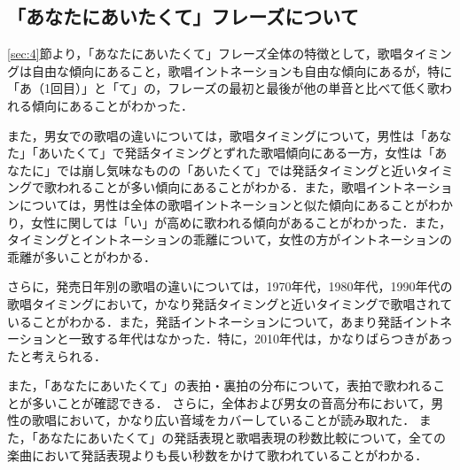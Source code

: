 \subsection{「あなたにあいたくて」フレーズについて}
\ref{sec:4}節より，「あなたにあいたくて」フレーズ全体の特徴として，歌唱タイミングは自由な傾向にあること，歌唱イントネーションも自由な傾向にあるが，特に「あ（1回目）」と「て」の，フレーズの最初と最後が他の単音と比べて低く歌われる傾向にあることがわかった．\par
また，男女での歌唱の違いについては，歌唱タイミングについて，男性は「あなた」「あいたくて」で発話タイミングとずれた歌唱傾向にある一方，女性は「あなたに」では崩し気味なものの「あいたくて」では発話タイミングと近いタイミングで歌われることが多い傾向にあることがわかる．また，歌唱イントネーションについては，男性は全体の歌唱イントネーションと似た傾向にあることがわかり，女性に関しては「い」が高めに歌われる傾向があることがわかった．また，タイミングとイントネーションの乖離について，女性の方がイントネーションの乖離が多いことがわかる．\par
さらに，発売日年別の歌唱の違いについては，1970年代，1980年代，1990年代の歌唱タイミングにおいて，かなり発話タイミングと近いタイミングで歌唱されていることがわかる．また，発話イントネーションについて，あまり発話イントネーションと一致する年代はなかった．特に，2010年代は，かなりばらつきがあったと考えられる．\par
また，「あなたにあいたくて」の表拍・裏拍の分布について，表拍で歌われることが多いことが確認できる．
さらに，全体および男女の音高分布において，男性の歌唱において，かなり広い音域をカバーしていることが読み取れた．
また，「あなたにあいたくて」の発話表現と歌唱表現の秒数比較について，全ての楽曲において発話表現よりも長い秒数をかけて歌われていることがわかる．

